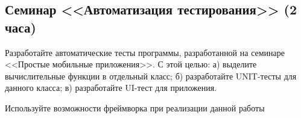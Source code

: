 \subsection{Семинар <<Автоматизация тестирования>> (2 часа)}

Разработайте автоматические тесты программы, разработанной на семинаре <<Простые мобильные приложения>>. 
С этой целью: а) выделите вычислительные функции в отдельный класс;
б) разработайте UNIT-тесты для данного класса; в) разработайте UI-тест для приложения.

Используйте возможности фреймворка при реализации данной работы
